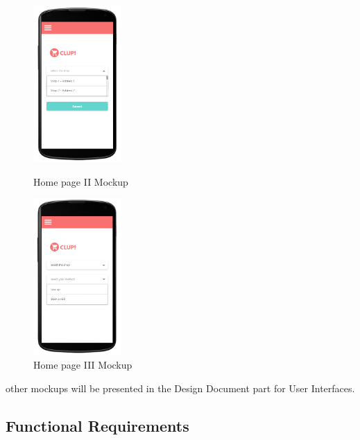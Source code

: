 \begin{figure}[H]
  \centering
  \includegraphics[width=0.3\textwidth,keepaspectratio]{images/10.png}
  \caption{Home page II Mockup}
  \centering
  \includegraphics[width=0.3\textwidth,keepaspectratio]{images/11.png}
  \caption{Home page III Mockup}
\end{figure}
other mockups will be presented in the Design Document part for User Interfaces.

\subsection{Functional Requirements}



